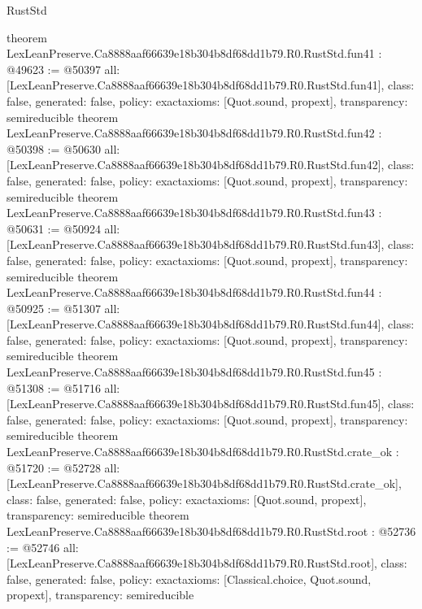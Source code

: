 \begin{lexlean}{RustStd}
\begin{coremodule}
{}
theorem LexLeanPreserve.Ca8888aaf66639e18b304b8df68dd1b79.R0.RustStd.fun41 : @49623 := @50397 {
  all: [LexLeanPreserve.Ca8888aaf66639e18b304b8df68dd1b79.R0.RustStd.fun41],
  class: false,
  generated: false,
  policy: exact{axioms: [Quot.sound, propext]},
  transparency: semireducible
}
theorem LexLeanPreserve.Ca8888aaf66639e18b304b8df68dd1b79.R0.RustStd.fun42 : @50398 := @50630 {
  all: [LexLeanPreserve.Ca8888aaf66639e18b304b8df68dd1b79.R0.RustStd.fun42],
  class: false,
  generated: false,
  policy: exact{axioms: [Quot.sound, propext]},
  transparency: semireducible
}
theorem LexLeanPreserve.Ca8888aaf66639e18b304b8df68dd1b79.R0.RustStd.fun43 : @50631 := @50924 {
  all: [LexLeanPreserve.Ca8888aaf66639e18b304b8df68dd1b79.R0.RustStd.fun43],
  class: false,
  generated: false,
  policy: exact{axioms: [Quot.sound, propext]},
  transparency: semireducible
}
theorem LexLeanPreserve.Ca8888aaf66639e18b304b8df68dd1b79.R0.RustStd.fun44 : @50925 := @51307 {
  all: [LexLeanPreserve.Ca8888aaf66639e18b304b8df68dd1b79.R0.RustStd.fun44],
  class: false,
  generated: false,
  policy: exact{axioms: [Quot.sound, propext]},
  transparency: semireducible
}
theorem LexLeanPreserve.Ca8888aaf66639e18b304b8df68dd1b79.R0.RustStd.fun45 : @51308 := @51716 {
  all: [LexLeanPreserve.Ca8888aaf66639e18b304b8df68dd1b79.R0.RustStd.fun45],
  class: false,
  generated: false,
  policy: exact{axioms: [Quot.sound, propext]},
  transparency: semireducible
}
theorem LexLeanPreserve.Ca8888aaf66639e18b304b8df68dd1b79.R0.RustStd.crate_ok : @51720 := @52728 {
  all: [LexLeanPreserve.Ca8888aaf66639e18b304b8df68dd1b79.R0.RustStd.crate_ok],
  class: false,
  generated: false,
  policy: exact{axioms: [Quot.sound, propext]},
  transparency: semireducible
}
theorem LexLeanPreserve.Ca8888aaf66639e18b304b8df68dd1b79.R0.RustStd.root : @52736 := @52746 {
  all: [LexLeanPreserve.Ca8888aaf66639e18b304b8df68dd1b79.R0.RustStd.root],
  class: false,
  generated: false,
  policy: exact{axioms: [Classical.choice, Quot.sound, propext]},
  transparency: semireducible
}


\end{coremodule}
\end{lexlean}
